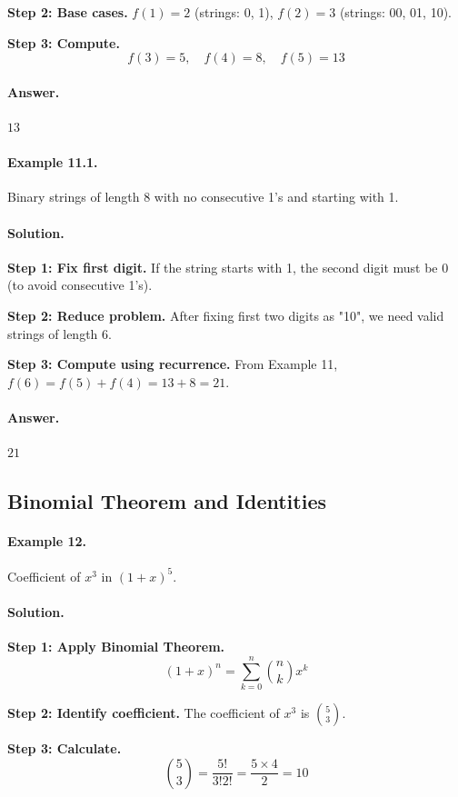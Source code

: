 \documentclass[12pt]{extarticle}
\begin{document}
\textbf{Step 2: Base cases.} $f(1) = 2$ (strings: 0, 1), $f(2) = 3$ (strings: 00, 01, 10).

\textbf{Step 3: Compute.}
\[
f(3) = 5, \quad f(4) = 8, \quad f(5) = 13
\]

\paragraph{Answer.} $\boxed{13}$

\paragraph{Example 11.1.} Binary strings of length 8 with no consecutive 1's and starting with 1.

\paragraph{Solution.}
\textbf{Step 1: Fix first digit.} If the string starts with 1, the second digit must be 0 (to avoid consecutive 1's).

\textbf{Step 2: Reduce problem.} After fixing first two digits as "10", we need valid strings of length 6.

\textbf{Step 3: Compute using recurrence.} From Example 11, $f(6) = f(5) + f(4) = 13 + 8 = 21$.

\paragraph{Answer.} $\boxed{21}$

\subsection{Binomial Theorem and Identities}

\paragraph{Example 12.} Coefficient of $x^3$ in $(1+x)^5$.

\paragraph{Solution.}
\textbf{Step 1: Apply Binomial Theorem.} 
\[
(1+x)^n = \sum_{k=0}^{n} \binom{n}{k} x^k
\]

\textbf{Step 2: Identify coefficient.} The coefficient of $x^3$ is $\binom{5}{3}$.

\textbf{Step 3: Calculate.}
\[
\binom{5}{3} = \frac{5!}{3!2!} = \frac{5 \times 4}{2} = 10
\]
\end{document}
